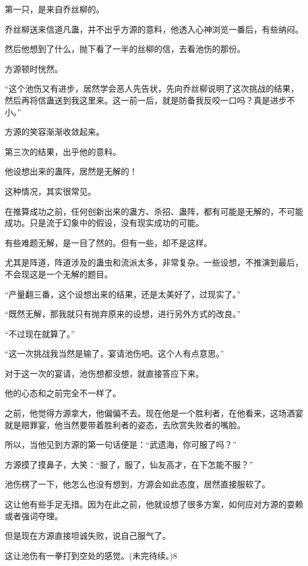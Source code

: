 \begin{this_body}
第一只，是来自乔丝柳的。

乔丝柳送来信道凡蛊，并不出乎方源的意料，他透入心神浏览一番后，有些纳闷。

然后他想到了什么，抛下看了一半的丝柳的信，去看池伤的那份。

方源顿时恍然。

“这个池伤又有进步，居然学会恶人先告状，先向乔丝柳说明了这次挑战的结果，然后再将信蛊送到我这里来。这一前一后，就是防备我反咬一口吗？真是进步不小。”

方源的笑容渐渐收敛起来。

第三次的结果，出乎他的意料。

他设想出来的蛊阵，居然是无解的！

这种情况，其实很常见。

在推算成功之前，任何创新出来的蛊方、杀招、蛊阵，都有可能是无解的，不可能成功。只是流于幻象中的假设，没有现实成功的可能。

有些难题无解，是一目了然的。但有一些，却不是这样。

尤其是阵道，阵道涉及的蛊虫和流派太多，非常复杂。一些设想，不推演到最后，不会现这是一个无解的题目。

“产量翻三番，这个设想出来的结果，还是太美好了，过现实了。”

“既然无解，那我就只有抛弃原来的设想，进行另外方式的改良。”

“不过现在就算了。”

“这一次挑战我当然是输了，宴请池伤吧。这个人有点意思。”

对于这一次的宴请，池伤想都没想，就直接答应下来。

他的心态和之前完全不一样了。

之前，他觉得方源拿大，他偏偏不去。现在他是一个胜利者，在他看来，这场酒宴就是赔罪宴，他当然要带着胜利者的姿态，去欣赏失败者的嘴脸。

所以，当他见到方源的第一句话便是：“武遗海，你可服了吗？”

方源摸了摸鼻子，大笑：“服了，服了，仙友高才，在下怎能不服？”

池伤楞了一下，他怎么也没有想到，方源会如此态度，居然直接服软了。

这让他有些手足无措。因为在此之前，他就设想了很多方案，如何应对方源的耍赖或者强词夺理。

但是现在方源直接坦诚失败，说自己服气了。

这让池伤有一拳打到空处的感觉。(未完待续。)8

\end{this_body}

